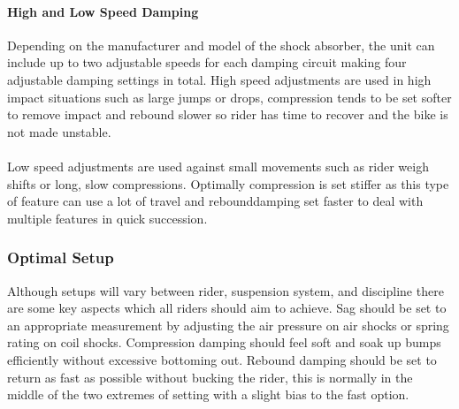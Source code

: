 	\paragraph{High and Low Speed Damping} 
		Depending on the manufacturer and model of the shock absorber, the unit can include up to two adjustable speeds for each damping circuit making four adjustable damping settings in total. High speed adjustments are used in high impact situations such as large jumps or drops, compression tends to be set softer to remove impact and rebound slower so rider has time to recover and the bike is not made unstable.
		\\\\
		Low speed adjustments are used against small movements such as rider weigh shifts or long, slow compressions. Optimally compression is set stiffer as this type of feature can use a lot of travel and \gls{rebounddamping} set faster to deal with multiple features in quick succession.
	\subsubsection{Optimal Setup}
		Although setups will vary between rider, suspension system, and discipline there are some key aspects which all riders should aim to achieve. Sag should be set to an appropriate measurement by adjusting the air pressure on air \glspl{shock} or spring rating on coil \glspl{shock}. Compression damping should feel soft and soak up bumps efficiently without excessive bottoming out. Rebound damping should be set to return as fast as possible without bucking the rider, this is normally in the middle of the two extremes of setting with a slight bias to the fast option.